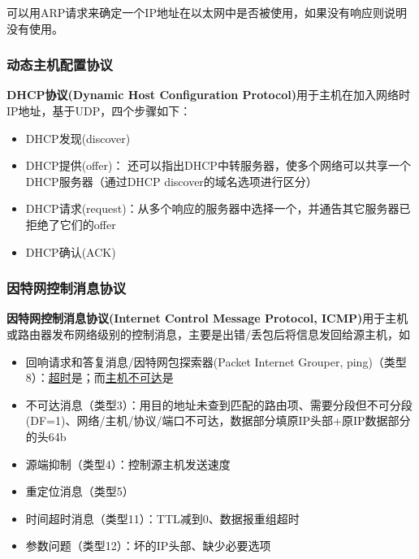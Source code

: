 可以用ARP请求来确定一个IP地址在以太网中是否被使用，如果没有响应则说明没有使用。

\subsubsection{动态主机配置协议}
\textbf{DHCP协议(Dynamic Host Configuration Protocol)}用于主机在加入网络时IP地址，基于UDP，四个步骤如下：
\begin{itemize}
	\item DHCP发现(discover)
	\item DHCP提供(offer)： 还可以指出DHCP中转服务器，使多个网络可以共享一个DHCP服务器（通过DHCP discover的域名选项进行区分）
	\item DHCP请求(request)：从多个响应的服务器中选择一个，并通告其它服务器已拒绝了它们的offer
	\item DHCP确认(ACK)
\end{itemize}

\subsubsection{因特网控制消息协议}
\textbf{因特网控制消息协议(Internet Control Message Protocol, ICMP)}用于主机或路由器发布网络级别的控制消息，主要是出错/丢包后将信息发回给源主机，如
\begin{itemize}
	\item 回响请求和答复消息/因特网包探索器(Packet Internet Grouper, ping)（类型8）：\underline{超时}是；而\underline{主机不可达}是
	\item 不可达消息（类型3）：用目的地址未查到匹配的路由项、需要分段但不可分段(DF=1)、网络/主机/协议/端口不可达，数据部分填原IP头部+原IP数据部分的头64b
	\item 源端抑制（类型4）：控制源主机发送速度
	\item 重定位消息（类型5）
	\item 时间超时消息（类型11）：TTL减到0、数据报重组超时
	\item 参数问题（类型12）：坏的IP头部、缺少必要选项
\end{itemize}

